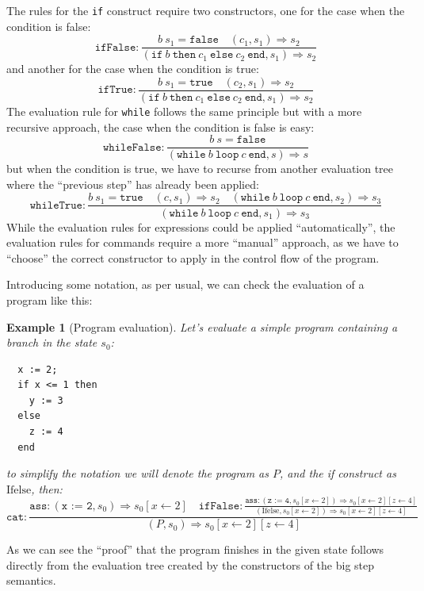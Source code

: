 \documentclass[
  a4paper, 
  10pt, 
  parskip=half, 
  DIV=20,
  toc=bibliography,
  usegeometry,
]{scrartcl}
\newtheorem{example}[theorem]{Example}
\newcommand{\bigstep}{\Longrightarrow}
\begin{document}
The rules for the \texttt{if} construct require two constructors,
one for the case when the condition is false:
\[
\texttt{ifFalse} : \frac{b \ s_1 = \texttt{false}  \quad (c_1, s_1) \bigstep s_2}
{(\texttt{if} \ b \ \texttt{then} \ c_1 \ \texttt{else} \ c_2 \ \texttt{end}, s_1) \bigstep s_2}
\]
and another for the case when the condition is true:
\[
\texttt{ifTrue} : \frac{b \ s_1 = \texttt{true}  \quad (c_2, s_1) \bigstep s_2}
{(\texttt{if} \ b \ \texttt{then} \ c_1 \ \texttt{else} \ c_2 \ \texttt{end}, s_1) \bigstep s_2}
\]
The evaluation rule for \texttt{while} follows the same principle but with a more
recursive approach, the case when the condition is false is easy:
\[
\texttt{whileFalse} : \frac{b \ s = \texttt{false}}
  {(\texttt{while} \ b \ \texttt{loop} \ c \ \texttt{end}, s) \bigstep s}
\]
but when the condition is true, we have to recurse from another evaluation tree
where the \enquote{previous step} has already been applied:
\[
\texttt{whileTrue} : \frac{b \ s_1 = \texttt{true} \quad (c, s_1) \bigstep s_2 \quad
  (\texttt{while} \ b \ \texttt{loop} \ c \ \texttt{end}, s_2) \bigstep s_3}
{(\texttt{while} \ b \ \texttt{loop} \ c \ \texttt{end}, s_1) \bigstep s_3}
\]
While the evaluation rules for
expressions could be applied \enquote{automatically}, the evaluation rules for
commands require a more \enquote{manual} approach, as we have to \enquote{choose}
the correct constructor to apply in the control flow of the program.

Introducing some notation, as per usual, we can check the evaluation of a
program like this:
\begin{example}[Program evaluation]
  Let's evaluate a simple program containing a branch in the state \(s_0\):
\begin{verbatim}
  x := 2;
  if x <= 1 then
    y := 3
  else
    z := 4
  end
\end{verbatim}
  to simplify the notation we will denote the program as \(P\), and the if construct as \(\text{Ifelse}\), then:
  \[
  \texttt{cat}: \frac{
    \texttt{ass}: (\texttt{x := 2}, s_0) \bigstep s_0[x \leftarrow 2]
    \quad
    \texttt{ifFalse}: \displaystyle{\frac{
      \texttt{ass}: (\texttt{z := 4}, s_0[x \leftarrow 2]) \bigstep s_0[x \leftarrow 2][z \leftarrow 4]
    }
    {
      (\text{Ifelse}, s_0[x \leftarrow 2]) \bigstep s_0[x \leftarrow 2][z \leftarrow 4]
    }}
  }{
    (P, s_0) \bigstep s_0[x \leftarrow 2][z \leftarrow 4]
  }
  \]
\end{example}
As we can see the \enquote{proof} that the program finishes in the given state
follows directly from the evaluation tree created by the constructors of the
big step semantics.
\end{document}
